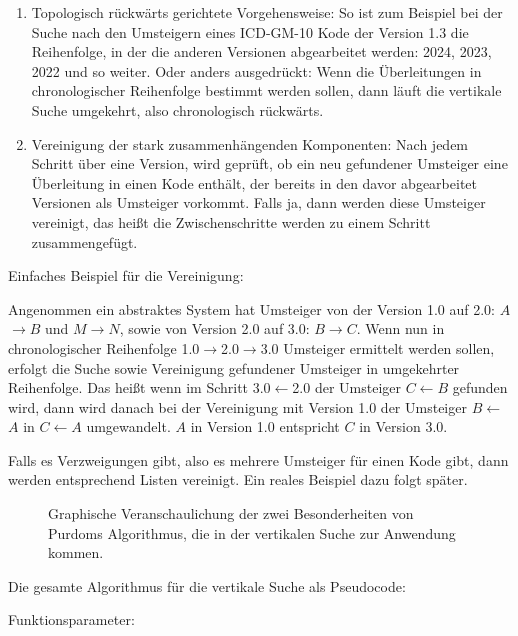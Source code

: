 \begin{enumerate}
\item Topologisch rückwärts gerichtete Vorgehensweise: So ist zum Beispiel bei der Suche nach den Umsteigern eines ICD-GM-10 Kode der Version 1.3 die Reihenfolge, in der die anderen Versionen abgearbeitet werden: 2024, 2023, 2022 und so weiter. Oder anders ausgedrückt: Wenn die Überleitungen in chronologischer Reihenfolge bestimmt werden sollen, dann läuft die vertikale Suche umgekehrt, also chronologisch rückwärts. 
\item Vereinigung der stark zusammenhängenden Komponenten: Nach jedem Schritt über eine Version, wird geprüft, ob ein neu gefundener Umsteiger eine Überleitung in einen Kode enthält, der bereits in den davor abgearbeitet Versionen als Umsteiger vorkommt. Falls ja, dann werden diese Umsteiger vereinigt, das heißt die Zwischenschritte werden zu einem Schritt zusammengefügt. 
\end{enumerate}

Einfaches Beispiel für die Vereinigung: 

Angenommen ein abstraktes System hat Umsteiger von der Version 1.0 auf 2.0: $A$$\rightarrow$$B$ und $M$$\rightarrow$$N$, sowie von Version 2.0 auf 3.0: $B$$\rightarrow$$C$. Wenn nun in chronologischer Reihenfolge 1.0$\rightarrow$2.0$\rightarrow$3.0 Umsteiger ermittelt werden sollen, erfolgt die Suche sowie Vereinigung gefundener Umsteiger in umgekehrter Reihenfolge. Das heißt wenn im Schritt 3.0$\leftarrow$2.0 der Umsteiger $C$$\leftarrow$$B$ gefunden wird, dann wird danach bei der Vereinigung mit Version 1.0 der Umsteiger $B$$\leftarrow$$A$ in $C$$\leftarrow$$A$ umgewandelt. $A$ in Version 1.0 entspricht $C$ in Version 3.0. 

Falls es Verzweigungen gibt, also es mehrere Umsteiger für einen Kode gibt, dann werden entsprechend Listen vereinigt. Ein reales Beispiel dazu folgt später. 

\begin{figure}[H]
    \centering\Huge%
    \resizebox{.75\linewidth}{!}{}
    \normalsize\caption{Graphische Veranschaulichung der zwei Besonderheiten von Purdoms Algorithmus, die in der vertikalen Suche zur Anwendung kommen.}
    \label{merge-illustrated}
\end{figure}

Die gesamte Algorithmus für die vertikale Suche als Pseudocode:


Funktionsparameter:

